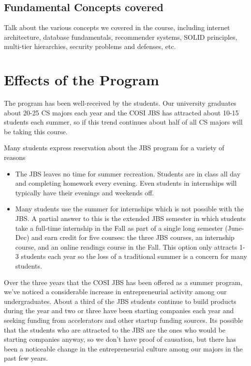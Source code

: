 \documentclass{sig-alternate}
\begin{document}
\subsection{Fundamental Concepts covered}
Talk about the various concepts we covered in the course, including internet architecture, database fundamentals, recommender systems, SOLID principles, multi-tier hierarchies, security problems and defenses, etc.


\section{Effects of the Program}
The program has been well-received by the students. Our university graduates about 20-25 CS majors each year and the COSI JBS has attracted about 10-15 students each summer, so if this trend continues about half of all CS majors will be taking this course.  

Many students express reservation about the JBS program for a variety of reasons
\begin{itemize}
\item The JBS leaves no time for summer recreation. Students are in class all day and completing homework every evening. Even students in internships will typically have their evenings and weekends off.  
\item Many students use the summer for internships which is not possible with the JBS. A partial answer to this is the extended JBS semester in which students take a full-time internship in the Fall as part of a single long semester (June-Dec) and earn credit for five courses: the three JBS courses, an internship course, and an online readings course in the Fall.  This option only attracts 1-3 students each year so the loss of a traditional summer is a concern for many students.
\end{itemize}

Over the three years that the COSI JBS has been offered as a summer program, we've noticed a considerable increase in entrepreneurial activity among our undergraduates.  About a third of the JBS students continue to build products during the year and two or three have been starting companies each year and seeking funding from accelerators and other startup funding sources.  Its possible that the students who are attracted to the JBS are the ones who would be starting companies anyway, so we don't have proof of causation, but there has been a noticeable change in the entrepreneurial culture among our majors in the past few years.
\end{document}
